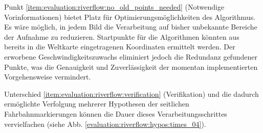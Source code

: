 Punkt \ref{item:evaluation:riverflow:no_old_points_needed} (Notwendige Vorinformationen) bietet Platz für Optimierungsmöglichkeiten des Algorithmus. Es wäre möglich, in jedem Bild die Verarbeitung auf bisher unbekannte Bereiche der Aufnahme zu reduzieren. Startpunkte für die Algorithmen könnten aus bereits in die Weltkarte eingetragenen Koordinaten ermittelt werden. Der erworbene Geschwindigkeitszuwachs eliminiert jedoch die Redundanz gefundener Punkte, was die Genauigkeit und Zuverlässigkeit der momentan implementierten Vorgehensweise vermindert.

Unterschied \ref{item:evaluation:riverflow:verification} (Verifikation) und die dadurch ermöglichte Verfolgung mehrerer Hypothesen der seitlichen Fahrbahnmarkierungen können die Dauer dieses Verarbeitungsschrittes vervielfachen (siehe Abb. \ref{evaluation:riverflow:hypos:times_04}).
